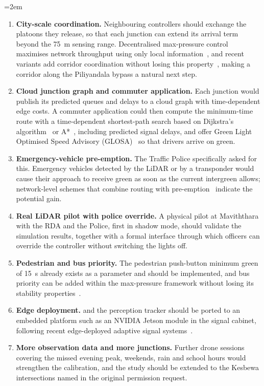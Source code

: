 {\emergencystretch=2em
\begin{enumerate}[leftmargin=*]
\item \textbf{City-scale coordination.} Neighbouring \prism{} controllers should exchange the platoons they release, so that each junction can extend its arrival term beyond the 75~m sensing range. Decentralised max-pressure control maximises network throughput using only local information~\cite{varaiya2013maxpressure,wongpiromsarn2012distributed}, and recent variants add corridor coordination without losing this property~\cite{xu2024smoothingmp}, making a corridor along the Piliyandala bypass a natural next step.
\item \textbf{Cloud junction graph and commuter application.} Each junction would publish its predicted queues and delays to a cloud graph with time-dependent edge costs. A commuter application could then compute the minimum-time route with a time-dependent shortest-path search based on Dijkstra's algorithm~\cite{dijkstra1959} or A*~\cite{hart1968astar}, including predicted signal delays, and offer Green Light Optimised Speed Advisory (GLOSA)~\cite{katsaros2011glosa} so that drivers arrive on green.
\item \textbf{Emergency-vehicle pre-emption.} The Traffic Police specifically asked for this. Emergency vehicles detected by the LiDAR or by a transponder would cause their approach to receive green as soon as the current intergreen allows; network-level schemes that combine routing with pre-emption~\cite{su2022emvlight} indicate the potential gain.
\item \textbf{Real LiDAR pilot with police override.} A physical pilot at Maviththara with the RDA and the Police, first in shadow mode, should validate the simulation results, together with a formal interface through which officers can override the controller without switching the lights off.
\item \textbf{Pedestrian and bus priority.} The pedestrian push-button minimum green of 15~s already exists as a parameter and should be implemented, and bus priority can be added within the max-pressure framework without losing its stability properties~\cite{xu2022tspmaxpressure}.
\item \textbf{Edge deployment.} \prism{} and the perception tracker should be ported to an embedded platform such as an NVIDIA Jetson module in the signal cabinet, following recent edge-deployed adaptive signal systems~\cite{raza2025edgeatlc}.
\item \textbf{More observation data and more junctions.} Further drone sessions covering the missed evening peak, weekends, rain and school hours would strengthen the calibration, and the study should be extended to the Kesbewa intersections named in the original permission request.
\end{enumerate}}

